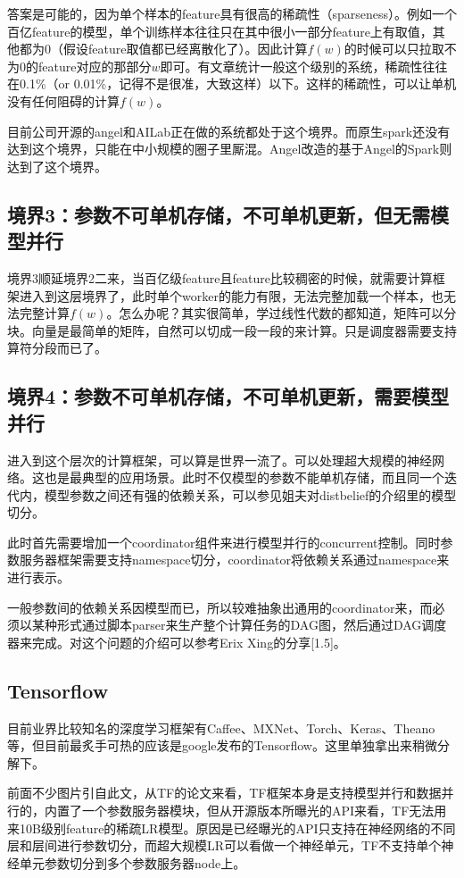 \documentclass[12pt]{article}
\begin{document}
答案是可能的，因为单个样本的feature具有很高的稀疏性（sparseness）。例如一个百亿feature的模型，单个训练样本往往只在其中很小一部分feature上有取值，其他都为0（假设feature取值都已经离散化了）。因此计算$f(w)$的时候可以只拉取不为0的feature对应的那部分$w$即可。有文章统计一般这个级别的系统，稀疏性往往在0.1\%（or 0.01\%，记得不是很准，大致这样）以下。这样的稀疏性，可以让单机没有任何阻碍的计算$f(w)$。

目前公司开源的angel和AILab正在做的系统都处于这个境界。而原生spark还没有达到这个境界，只能在中小规模的圈子里厮混。Angel改造的基于Angel的Spark则达到了这个境界。

\subsection{境界3：参数不可单机存储，不可单机更新，但无需模型并行}
境界3顺延境界2二来，当百亿级feature且feature比较稠密的时候，就需要计算框架进入到这层境界了，此时单个worker的能力有限，无法完整加载一个样本，也无法完整计算$f(w)$。怎么办呢？其实很简单，学过线性代数的都知道，矩阵可以分块。向量是最简单的矩阵，自然可以切成一段一段的来计算。只是调度器需要支持算符分段而已了。

\subsection{境界4：参数不可单机存储，不可单机更新，需要模型并行}
进入到这个层次的计算框架，可以算是世界一流了。可以处理超大规模的神经网络。这也是最典型的应用场景。此时不仅模型的参数不能单机存储，而且同一个迭代内，模型参数之间还有强的依赖关系，可以参见姐夫对distbelief的介绍里的模型切分。

此时首先需要增加一个coordinator组件来进行模型并行的concurrent控制。同时参数服务器框架需要支持namespace切分，coordinator将依赖关系通过namespace来进行表示。

一般参数间的依赖关系因模型而已，所以较难抽象出通用的coordinator来，而必须以某种形式通过脚本parser来生产整个计算任务的DAG图，然后通过DAG调度器来完成。对这个问题的介绍可以参考Erix Xing的分享[1.5]。

\subsection{Tensorflow}
目前业界比较知名的深度学习框架有Caffee、MXNet、Torch、Keras、Theano等，但目前最炙手可热的应该是google发布的Tensorflow。这里单独拿出来稍微分解下。

前面不少图片引自此文，从TF的论文来看，TF框架本身是支持模型并行和数据并行的，内置了一个参数服务器模块，但从开源版本所曝光的API来看，TF无法用来10B级别feature的稀疏LR模型。原因是已经曝光的API只支持在神经网络的不同层和层间进行参数切分，而超大规模LR可以看做一个神经单元，TF不支持单个神经单元参数切分到多个参数服务器node上。
\end{document}
